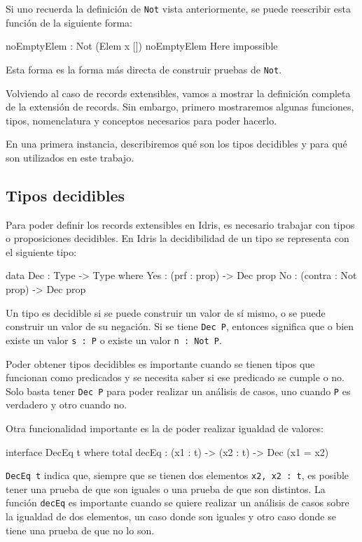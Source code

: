 Si uno recuerda la definición de \texttt{Not} vista anteriormente, se puede reescribir esta función de la siguiente forma:

\begin{code}
noEmptyElem : Not (Elem x [])
noEmptyElem Here impossible
\end{code}

Esta forma es la forma más directa de construir pruebas de \texttt{Not}.

Volviendo al caso de records extensibles, vamos a mostrar la definición completa de la extensión de records. Sin embargo, primero mostraremos algunas funciones, tipos, nomenclatura y conceptos necesarios para poder hacerlo.

En una primera instancia, describiremos qué son los tipos decidibles y para qué son utilizados en este trabajo.

\subsection{Tipos decidibles}

Para poder definir los records extensibles en Idris, es necesario trabajar con tipos o proposiciones decidibles. En Idris la decidibilidad de un tipo se representa con el siguiente tipo:

\begin{code}
data Dec : Type -> Type where
  Yes : (prf : prop) -> Dec prop
  No : (contra : Not prop) -> Dec prop
\end{code}

Un tipo es decidible si se puede construir un valor de sí mismo, o se puede construir un valor de su negación. Si se tiene \texttt{Dec P}, entonces significa que o bien existe un valor \texttt{s : P} o existe un valor \texttt{n : Not P}.

Poder obtener tipos decidibles es importante cuando se tienen tipos que funcionan como predicados y se necesita saber si ese predicado se cumple o no. Solo basta tener \texttt{Dec P} para poder realizar un análisis de casos, uno cuando \texttt{P} es verdadero y otro cuando no.

Otra funcionalidad importante es la de poder realizar igualdad de valores:

\begin{code}
interface DecEq t where
  total decEq : (x1 : t) -> (x2 : t) -> Dec (x1 = x2)
\end{code}

\texttt{DecEq t} indica que, siempre que se tienen dos elementos \texttt{x2, x2 : t}, es posible tener una prueba de que son iguales o una prueba de que son distintos. La función \texttt{decEq} es importante cuando se quiere realizar un análisis de casos sobre la igualdad de dos elementos, un caso donde son iguales y otro caso donde se tiene una prueba de que no lo son.

